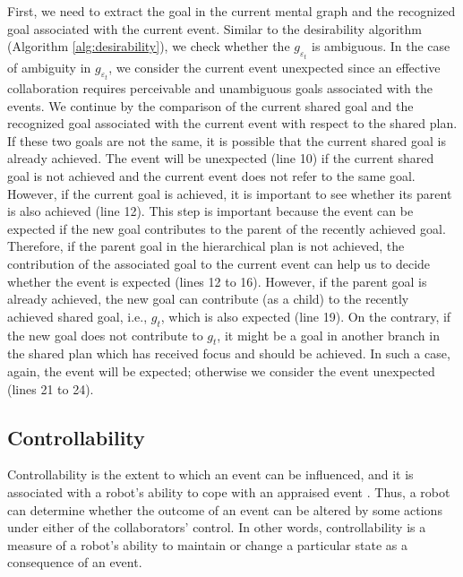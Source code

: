 \documentclass{aamas2016}
\begin{document}
First, we need to extract the goal in the current mental graph and the
recognized goal associated with the current event. Similar to the desirability
algorithm (Algorithm \ref{alg:desirability}), we check whether the
$\mathit{g}_{\varepsilon_t}$ is ambiguous. In the case of ambiguity in
$\mathit{g}_{\varepsilon_t}$, we consider the current event unexpected since an
effective collaboration requires perceivable and unambiguous goals associated
with the events. We continue by the comparison of the current shared goal and
the recognized goal associated with the current event with respect to the shared
plan. If these two goals are not the same, it is possible that the current
shared goal is already achieved. The event will be unexpected (line 10) if the
current shared goal is not achieved and the current event does not refer to the
same goal. However, if the current goal is achieved, it is important to see
whether its parent is also achieved (line 12). This step is important because
the event can be expected if the new goal contributes to the parent of the
recently achieved goal. Therefore, if the parent goal in the hierarchical plan
is not achieved, the contribution of the associated goal to the current event
can help us to decide whether the event is expected (lines 12 to 16). However,
if the parent goal is already achieved, the new goal can contribute (as a child)
to the recently achieved shared goal, i.e., $\mathit{g}_{t}$, which is also
expected (line 19). On the contrary, if the new goal does not contribute to
$\mathit{g}_{t}$, it might be a goal in another branch in the shared plan which
has received focus and should be achieved. In such a case, again, the event will
be expected; otherwise we consider the event unexpected (lines 21 to 24).

\vspace*{-2mm}
\subsection{Controllability}

Controllability is the extent to which an event can be influenced, and it is
associated with a robot's ability to cope with an appraised event
\cite{gratch:domain-independent}. Thus, a robot can determine whether the
outcome of an event can be altered by some actions under either of the
collaborators' control. In other words, controllability is a measure of a
robot's ability to maintain or change a particular state as a consequence of an
event.
\end{document}
